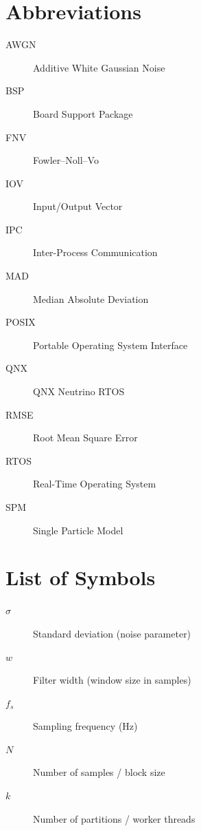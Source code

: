 \documentclass[12pt,a4paper,oneside]{report}
\begin{document}
\clearpage
{}
\setcounter{page}{1}

\tableofcontents

\clearpage
{}
\listoffigures

\clearpage
{}
\listoftables

\clearpage
{}
\chapter*{Abbreviations}

\begin{description}
  \item[AWGN] Additive White Gaussian Noise
  \item[BSP] Board Support Package
  \item[FNV] Fowler--Noll--Vo
  \item[IOV] Input/Output Vector
  \item[IPC] Inter-Process Communication
  \item[MAD] Median Absolute Deviation
  \item[POSIX] Portable Operating System Interface
  \item[QNX] QNX Neutrino RTOS
  \item[RMSE] Root Mean Square Error
  \item[RTOS] Real-Time Operating System
  \item[SPM] Single Particle Model
\end{description}

\clearpage
{}
\chapter*{List of Symbols}

\begin{description}
  \item[$\sigma$] Standard deviation (noise parameter)
  \item[$w$] Filter width (window size in samples)
  \item[$f_s$] Sampling frequency (Hz)
  \item[$N$] Number of samples / block size
  \item[$k$] Number of partitions / worker threads
\end{description}
\end{document}
